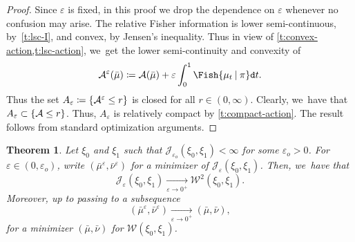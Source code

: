 \documentclass[10pt]{amsart}
\newtheorem{theorem}{Theorem}[section]
\theoremstyle{definition}
\theoremstyle{remark}
\DeclarePairedDelimiter{\set}{\lbrace}{\rbrace}
\newcommand{\given}[1][]{%
\nonscript\:#1\vert
\allowbreak
\nonscript\:
\mathopen{}}
\begin{document}
\begin{proof}
Since $\varepsilon$ is fixed, in this proof we drop the dependence on $\varepsilon$ whenever no confusion may arise.
The relative Fisher information is lower semi-continuous, by~\cref{t:lsc-I}, and convex, by Jensen's inequality.
Thus in view of \cref{t:convex-action,t:lsc-action}, we~get the lower semi-continuity and convexity of
\begin{equation}\label{e:action-epsilon}
\mathcal{A}^{\varepsilon}(\bar{\mu}) \coloneq \mathcal{A}(\bar{\mu}) + \varepsilon \int_{0}^{1} \Fish{ \mu_{t} \given \pi } \mathtt{d} t.
\end{equation}
Thus the set $A_{\varepsilon} \coloneq \set{ \mathcal{A}^{\varepsilon} \leq r }$ is closed for all $r \in (0,\infty)$.
Clearly, we~have that $A_{\varepsilon} \subset \set{\mathcal{A} \leq r}$.
Thus, $A_{\varepsilon}$ is relatively compact by \cref{t:compact-action}.
The result follows from standard optimization arguments.
\end{proof}

\begin{theorem}\label{t:gamma-convergence}
Let $\xi_{0}$ and $\xi_{1}$ such that $\mathcal{J}_{\varepsilon_{o}}(\xi_{0}, \xi_{1}) < \infty$ for some $\varepsilon_{o} > 0$.
For $\varepsilon \in (0,\varepsilon_{o})$, write $(\bar{\mu}^{\varepsilon}, \bar{\nu}^{\varepsilon})$ for a minimizer of $\mathcal{J}_{\varepsilon}(\xi_{0}, \xi_{1})$.
Then, we~have that
\begin{equation*}
\mathcal{J}_{\varepsilon}(\xi_{0}, \xi_{1}) \xrightarrow[\varepsilon \to 0^{+}]{} \mathcal{W}^{2}(\xi_{0}, \xi_{1}).
\end{equation*}
Moreover, up to passing to a subsequence
\begin{equation*}
(\bar{\mu}^{\varepsilon}, \bar{\nu}^{\varepsilon}) \xrightarrow[\varepsilon \to 0^{+}]{} (\bar{\mu}, \bar{\nu}),
\end{equation*}
for a minimizer $(\bar{\mu}, \bar{\nu})$ for $\mathcal{W}(\xi_{0}, \xi_{1})$.
\end{theorem}
\end{document}
